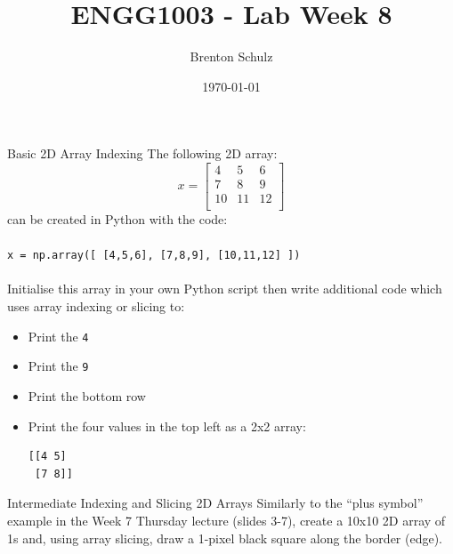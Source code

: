 \documentclass{lab}
\title{ENGG1003 - Lab Week 8}
\author{Brenton Schulz}
\date{\today}
\begin{document}
\maketitle
\begin{task}{Basic 2D Array Indexing}{}
The following 2D array:
$$x = 
\begin{bmatrix} 
4 & 5 & 6 \\
7 & 8 & 9\\
10 & 11 & 12 \\
\end{bmatrix}
$$
can be created in Python with the code:\\~\\ \texttt{x = np.array([ [4,5,6], [7,8,9], [10,11,12] ])}
\\~\\
Initialise this array in your own Python script then write additional code which uses array indexing or slicing to:
\begin{itemize}
\item Print the \texttt{4}
\item Print the \texttt{9}
\item Print the bottom row
\item Print the four values in the top left as a 2x2 array:
\begin{lstlisting}
[[4 5]
 [7 8]]
\end{lstlisting}
\end{itemize}
\end{task}

\begin{task}{Intermediate Indexing and Slicing 2D Arrays}{}
Similarly to the ``plus symbol'' example in the Week 7 Thursday lecture (slides 3-7), create a 10x10 2D array of 1s and, using array slicing, draw a 1-pixel black square along the border (edge).
\end{task}

\pagebreak
\end{document}
